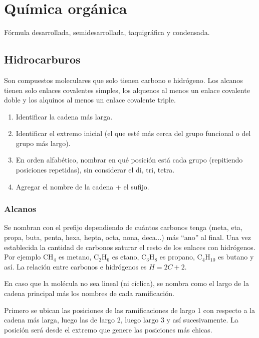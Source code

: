 \section{Química orgánica}

Fórmula desarrollada, semidesarrollada, taquigráfica y condensada.


\subsection*{Hidrocarburos}

Son compuestos moleculares que solo tienen carbono e hidrógeno. Los alcanos tienen solo enlaces covalentes simples, los alquenos al menos un enlace covalente doble y los alquinos al menos un enlace covalente triple.

\begin{enumerate}
    \item Identificar la cadena más larga.
    \item Identificar el extremo inicial (el que esté más cerca del grupo funcional o del grupo más largo).
    \item En orden alfabético, nombrar en qué posición está cada grupo (repitiendo posiciones repetidas), sin considerar el di, tri, tetra.
    \item Agregar el nombre de la cadena + el sufijo.
\end{enumerate}


\subsubsection*{Alcanos}

Se nombran con el prefijo dependiendo de cuántos carbonos tenga (meta, eta, propa, buta, penta, hexa, hepta, octa, nona, deca...)  más ``ano'' al final. Una vez establecida la cantidad de carbonos saturar el resto de los enlaces con hidrógenos. Por ejemplo CH$_4$ es metano, C$_2$H$_6$ es etano, C$_3$H$_8$ es propano, C$_4$H$_{10}$ es butano y así. La relación entre carbonos e hidrógenos es $H = 2C + 2$.

En caso que la molécula no sea lineal (ni cíclica), se nombra como el largo de la cadena principal más los nombres de cada ramificación.

Primero se ubican las posiciones de las ramificaciones de largo 1 con respecto a la cadena más larga, luego las de largo 2, luego largo 3 y así sucesivamente. La posición será desde el extremo que genere las posiciones más chicas.


